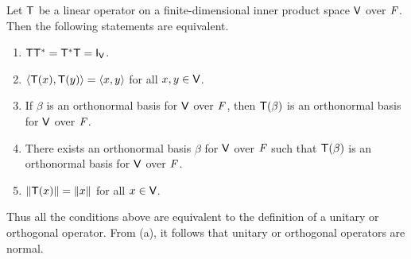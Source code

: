 \begin{thm}\label{6.18}
  Let \(\mathsf{T}\) be a linear operator on a finite-dimensional inner product space \(\mathsf{V}\) over \(\mathit{F}\).
  Then the following statements are equivalent.
  \begin{enumerate}
    \item \(\T \T^* = \T^* \T = \IT[\V]\).
    \item \(\left\langle\mathsf{T}(x), \mathsf{T}(y)\right\rangle = \left\langle x, y\right\rangle\) for all \(x, y \in \mathsf{V}\).
    \item If \(\beta\) is an orthonormal basis for \(\mathsf{V}\) over \(\mathit{F}\), then \(\mathsf{T}(\beta)\) is an orthonormal basis for \(\mathsf{V}\) over \(\mathit{F}\).
    \item There exists an orthonormal basis \(\beta\) for \(\mathsf{V}\) over \(\mathit{F}\) such that \(\mathsf{T}(\beta)\) is an orthonormal basis for \(\mathsf{V}\) over \(\mathit{F}\).
    \item \(\left\lVert\mathsf{T}(x)\right\rVert = \left\lVert x\right\rVert\) for all \(x \in \mathsf{V}\).
  \end{enumerate}
  Thus all the conditions above are equivalent to the definition of a unitary or orthogonal operator.
  From (a), it follows that unitary or orthogonal operators are normal.
\end{thm}

